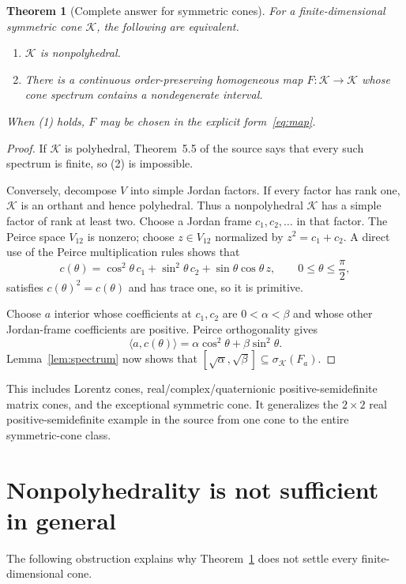 \documentclass[10pt]{article}
\newtheorem{theorem}{Theorem}
\newcommand{\K}{\mathcal K}
\begin{document}
\begin{theorem}[Complete answer for symmetric cones]\label{thm:symmetric}
For a finite-dimensional symmetric cone $\K$, the following are equivalent.
\begin{enumerate}
\item $\K$ is nonpolyhedral.
\item There is a continuous order-preserving homogeneous map $F:\K\to\K$
whose cone spectrum contains a nondegenerate interval.
\end{enumerate}
When (1) holds, $F$ may be chosen in the explicit form~\eqref{eq:map}.
\end{theorem}

\begin{proof}
If $\K$ is polyhedral, Theorem~5.5 of the source says that every such spectrum
is finite, so (2) is impossible.

Conversely, decompose $V$ into simple Jordan factors.  If every factor has
rank one, $\K$ is an orthant and hence polyhedral.  Thus a nonpolyhedral
$\K$ has a simple factor of rank at least two.  Choose a Jordan frame
$c_1,c_2,\ldots$ in that factor.  The Peirce space $V_{12}$ is nonzero; choose
$z\in V_{12}$ normalized by $z^2=c_1+c_2$.  A direct use of the Peirce
multiplication rules shows that
\[
 c(\theta)=\cos^2\!\theta\,c_1+\sin^2\!\theta\,c_2
 +\sin\theta\cos\theta\,z,
 \qquad0\leq\theta\leq\frac\pi2,
\]
satisfies $c(\theta)^2=c(\theta)$ and has trace one, so it is primitive.

Choose $a$ interior whose coefficients at $c_1,c_2$ are
$0<\alpha<\beta$ and whose other Jordan-frame coefficients are positive.
Peirce orthogonality gives
\[
 \langle a,c(\theta)\rangle
 =\alpha\cos^2\!\theta+\beta\sin^2\!\theta.
\]
Lemma~\ref{lem:spectrum} now shows that
$[\sqrt\alpha,\sqrt\beta]\subseteq\sigma_{\K}(F_a)$.
\end{proof}

This includes Lorentz cones, real/complex/quaternionic positive-semidefinite
matrix cones, and the exceptional symmetric cone.  It generalizes the
$2\times2$ real positive-semidefinite example in the source from one cone to
the entire symmetric-cone class.

\section{Nonpolyhedrality is not sufficient in general}

The following obstruction explains why Theorem~\ref{thm:symmetric} does not
settle every finite-dimensional cone.
\end{document}
